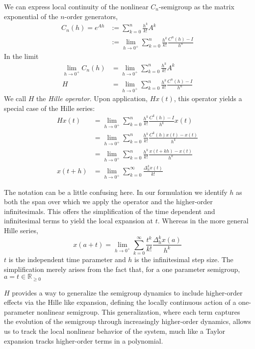 \documentclass{article}
\newcommand{\R}{\mathbb{R}}
\begin{document}
We can express local continuity of the nonlinear $C_n$-semigroup as the matrix exponential of the $n$-order generators,
\begin{align*}
     C_n(h) = e^{Ah} &:= \sum_{k=0}^n \frac{h^k}{k!} A^k\\
     &:= \lim_{h\rightarrow0^+} \sum_{k=0}^n \frac{h^k}{k!} \frac{C^n(h) - I}{h^n} 
\end{align*}
In the limit
\begin{align*}
    \lim_{h\rightarrow0^+} C_n(h) &= \lim_{h\rightarrow0^+} \sum_{k=0}^n \frac{h^k}{k!} A^k \\
    H &= \lim_{h\rightarrow0^+} \sum_{k=0}^n \frac{h^k}{k!} \frac{C^n(h) - I}{h^n}
\end{align*}
We call $H$ the \textit{Hille operator}. Upon application, \( Hx(t) \), this operator yields a special case of the Hille series:
\begin{align*}
    H x(t) &= \lim_{h\rightarrow0^+} \sum_{k=0}^n \frac{h^k}{k!} \frac{C^k(h) - I}{h^k} x(t)\\
     &= \lim_{h\rightarrow0^+} \sum_{k=0}^n \frac{h^k}{k!} \frac{C^k(h)x(t) - x(t)}{h^k}\\
      &= \lim_{h\rightarrow0^+} \sum_{k=0}^n \frac{h^k}{k!} \frac{x(t+kh) - x(t)}{h^k}\\
    x(t+h) &= \lim_{h\rightarrow0^+} \sum_{k=0}^\infty \frac{\Delta_h^k x(t) }{k!} 
\end{align*}
\begin{tcolorbox}[colback=gray!10, colframe=gray!40, width=\textwidth, boxrule=0pt, sharp corners, leftrule=4mm]

    The notation can be a little confusing here. In our formulation we identify $h$ as both the span over which we apply the operator and the higher-order infinitesimals. This offers the simplification of the time dependent and infinitesimal terms to yield the local expansion at $t$. Whereas in the more general Hille series,
    $$
    x(a+t) = \lim_{h\rightarrow0^+}\sum_{k=0}^\infty \frac{t^k}{k!} \frac{\Delta^k_h x(a)}{h^k} 
    $$
    $t$ is the independent time parameter and $h$ is the infinitesimal step size. The simplification merely arises from the fact that, for a one parameter semigroup, $a=t\in \R_{\geq0}$

\end{tcolorbox}

 $H$ provides a way to generalize the semigroup dynamics to include higher-order effects via the Hille like expansion, defining the locally continuous action of a one-parameter nonlinear semigroup. This generalization, where each term captures the evolution of the semigroup through increasingly higher-order dynamics, allows us to track the local nonlinear behavior of the system, much like a Taylor expansion tracks higher-order terms in a polynomial.
\end{document}
